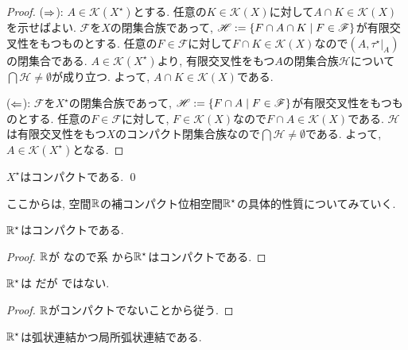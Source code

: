 \documentclass[uplatex, dvipdfmx, a4paper, 12pt, class=jsbook, crop=false]{standalone}
\begin{document}
\begin{proof}
	($\Rightarrow$): $ A \in \mathcal{K}(X^\star) $とする. 任意の$ K \in \mathcal{K}(X) $に対して$ A \cap K \in \mathcal{K}(X) $を示せばよい. $ \mathscr{F} $を$ X $の閉集合族であって, $ \mathscr{H} \defeq \setcomp{F \cap A \cap K}{F \in \mathscr{F}} $が有限交叉性をもつものとする. 任意の$ F \in \mathscr{F} $に対して$ F \cap K \in \mathcal{K}(X) $なので$ (A, \tau^\star|_A) $の閉集合である. $ A \in \mathcal{K}(X^\star) $より, 有限交叉性をもつ$ A $の閉集合族$ \mathscr{H} $について$ \bigcap \mathscr{H} \neq \emptyset $が成り立つ. よって, $ A \cap K \in \mathcal{K}(X) $である.

	($\Leftarrow$): $ \mathscr{F} $を$ X^\star $の閉集合族であって, $ \mathscr{H} \defeq \setcomp{F \cap A}{F \in \mathscr{F}} $が有限交叉性をもつものとする.
	任意の$ F \in \mathscr{F} $に対して, $ F \in \mathcal{K}(X) $なので$ F \cap A \in \mathcal{K}(X) $である.
	$ \mathscr{H} $は有限交叉性をもつ$ X $のコンパクト閉集合族なので$ \bigcap \mathscr{H} \neq \emptyset $である.
	よって, $ A \in \mathcal{K}(X^\star) $となる.
\end{proof}

\begin{corollary}
    $ X^\star $はコンパクトである. \qed
\end{corollary}




ここからは, \Euclid 空間$ \mathbb{R} $の補コンパクト位相空間$ \mathbb{R}^\star $の具体的性質についてみていく.

\begin{property}
	$ \mathbb{R}^\star $はコンパクトである.
\end{property}

\begin{proof}
	$ \mathbb{R} $が \Hausdorff なので系  から$ \mathbb{R}^\star $はコンパクトである.
\end{proof}

\begin{property}
	$ \mathbb{R}^\star $は  だが  ではない.
\end{property}

\begin{proof}
	$ \mathbb{R} $がコンパクトでないことから従う.
\end{proof}

\begin{property}
	$ \mathbb{R}^\star $は弧状連結かつ局所弧状連結である.
\end{property}
\end{document}
